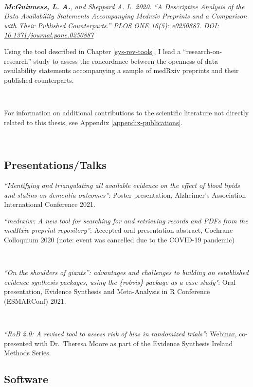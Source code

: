 \documentclass[a4paper, twoside]{templates/ociamthesis}
\begin{document}
~

\emph{\textbf{McGuinness, L. A.}, and Sheppard A. L. 2020. ``A Descriptive Analysis of the Data Availability Statements Accompanying Medrxiv Preprints and a Comparison with Their Published Counterparts.'' PLOS ONE 16(5): e0250887. DOI: \href{https://doi.org/10.1371/journal.pone.0250887}{10.1371/journal.pone.0250887}}

Using the tool described in Chapter \ref{sys-rev-tools}, I lead a ``research-on-research'' study to assess the concordance between the openness of data availability statements accompanying a sample of medRxiv preprints and their published counterparts.

~

For information on additional contributions to the scientific literature not directly related to this thesis, see Appendix \ref{appendix-publications}.

~

\hypertarget{presentationstalks}{%
\subsection{Presentations/Talks}\label{presentationstalks}}

\emph{``Identifying and triangulating all available evidence on the effect of blood lipids and statins on dementia outcomes''}: Poster presentation, Alzheimer's Association International Conference 2021.
~

\emph{``medrxivr: A new tool for searching for and retrieving records and PDFs from the medRxiv preprint repository''}: Accepted oral presentation abstract, Cochrane Colloquium 2020 (note: event was cancelled due to the COVID-19 pandemic)

~

\emph{``On the shoulders of giants'': advantages and challenges to building on established evidence synthesis packages, using the \{robvis\} package as a case study"}: Oral presentation, Evidence Synthesis and Meta-Analysis in R Conference (ESMARConf) 2021.

~

\emph{``RoB 2.0: A revised tool to assess risk of bias in randomized trials''}: Webinar, co-presented with Dr.~Theresa Moore as part of the Evidence Synthesis Ireland Methods Series.

\hypertarget{outputs-software}{%
\subsection{Software}\label{outputs-software}}
\end{document}
